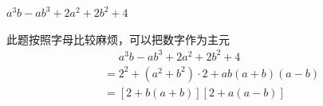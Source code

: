 \documentclass[windows,csize4]{BHCexam}
\begin{document}
\begin{groups}
\begin{questions}[]
        \question[5]$a^3b-ab^3+2a^2+2b^2+4$
        \begin{solution}{0.5cm}
            \methodonly 此题按照字母比较麻烦，可以把数字作为主元
            \[
                \begin{aligned}
                     & \phantom{=}a^3b-ab^3+2a^2+2b^2+4   \\
                     & =2^2+(a^2+b^2)\cdot 2+ab(a+b)(a-b) \\
                     & =[2+b(a+b)][2+a(a-b)]
                \end{aligned}
            \]
        \end{solution}
        \vspace{3.5cm}


    \end{questions}
\end{groups}


\label{lastpage}
\end{document}

